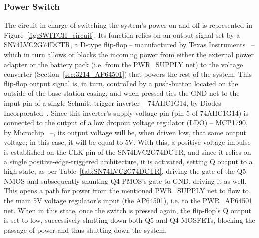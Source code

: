 
\subsubsection{Power Switch}\label{sec:3213_SWITCH}

The circuit in charge of switching the system's power on and off is represented in Figure~\ref{fig:SWITCH_circuit}. Its function relies on an output signal set by a SN74LVC2G74DCTR, a D-type flip-flop -- manufactured by Texas Instruments~\cite{SN74LVC2G74DCTR} -- which in turn allows or blocks the incoming power from either the external power adapter or the battery pack (i.e. from the PWR\_SUPPLY net) to the voltage converter (Section~\ref{sec:3214_AP64501}) that powers the rest of the system.
This flip-flop output signal is, in turn, controlled by a push-button located on the outside of the base station casing, and when pressed ties the GND net to the input pin of a single Schmitt-trigger inverter -- 74AHC1G14, by Diodes Incorporated~\cite{74AHC1G14}.
Since this inverter's supply voltage pin (pin 5 of 74AHC1G14) is connected to the output of a low dropout voltage regulator (LDO) -- MCP1790, by Microchip~\cite{MCP1790} --, its output voltage will be, when driven low, that same output voltage; in this case, it will be equal to 5V.
With this, a positive voltage impulse is established on the CLK pin of the SN74LVC2G74DCTR, and since it relies on a single positive-edge-triggered architecture, it is activated, setting Q output to a high state, as per Table~\ref{tab:SN74LVC2G74DCTR}, driving the gate of the Q5 NMOS and subsequently shunting Q4 PMOS's gate to GND, driving it as well.
This opens a path for power from the mentioned PWR\_SUPPLY net to flow to the main 5V voltage regulator's input (the AP64501), i.e. to the PWR\_AP64501 net. When in this state, once the switch is pressed again, the flip-flop's Q output is set to low, successively shutting down both Q5 and Q4 MOSFETs, blocking the passage of power and thus shutting down the system.

